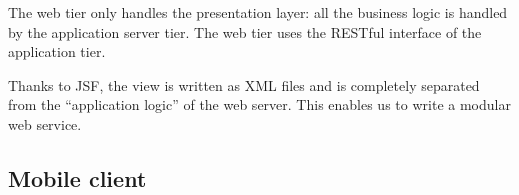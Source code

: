 The web tier only handles the presentation layer: all the business logic is handled by the application server tier. The web tier uses the RESTful interface of the application tier.

Thanks to JSF, the view is written as XML files and is completely separated from the ``application logic'' of the web server. This enables us to write a modular web service.

\subsection{Mobile client}
